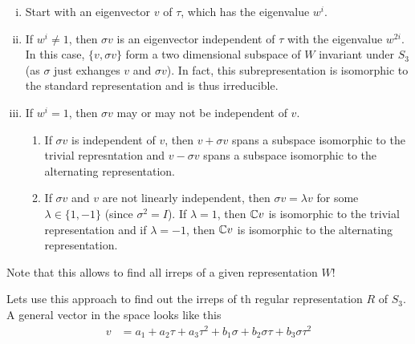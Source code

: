 \begin{enumerate}[(i)]
    \item Start with an eigenvector $v$ of $\tau$, which has the eigenvalue $w^i$.
    \item If $w^i\neq 1$, then $\sigma v$ is an eigenvector independent of $\tau$ with the eigenvalue $w^{2i}$. In this case, $\{v,\sigma v\}$ form a two dimensional subspace of $W$ invariant under $S_3$ (as $\sigma$ just exhanges $v$ and $\sigma v$). In fact, this subrepresentation is isomorphic to the standard representation and is thus irreducible.
    \item If $w^i = 1$, then $\sigma v$ may or may not be independent of $v$.
        \begin{enumerate}
            \item If $\sigma v$ is independent of $v$, then $v + \sigma v$ spans a subspace isomorphic to the trivial represntation and $v - \sigma v$ spans a subspace isomorphic to the alternating representation. 
            \item If $\sigma v$ and $v$ are not linearly independent, then 
                $\sigma v= \lambda v$ for some $\lambda\in \{1,-1\}$ (since $\sigma^2=I$). If $\lambda=1$, then $\mathbb{C} v$ is isomorphic to the trivial representation and if $\lambda=-1$, then $\mathbb{C} v$ is isomorphic to the alternating representation.
        \end{enumerate}
\end{enumerate}

Note that this allows to find all irreps of a given representation $W$!

 Lets use this approach to find out the irreps of th regular representation $R$ of $S_3$. A general vector in the space looks like this
\begin{align}
    v &= a_1 + a_2 \tau + a_3 \tau^2 + b_1\sigma + b_2 \sigma\tau + b_3\sigma \tau^2 
\end{align}

